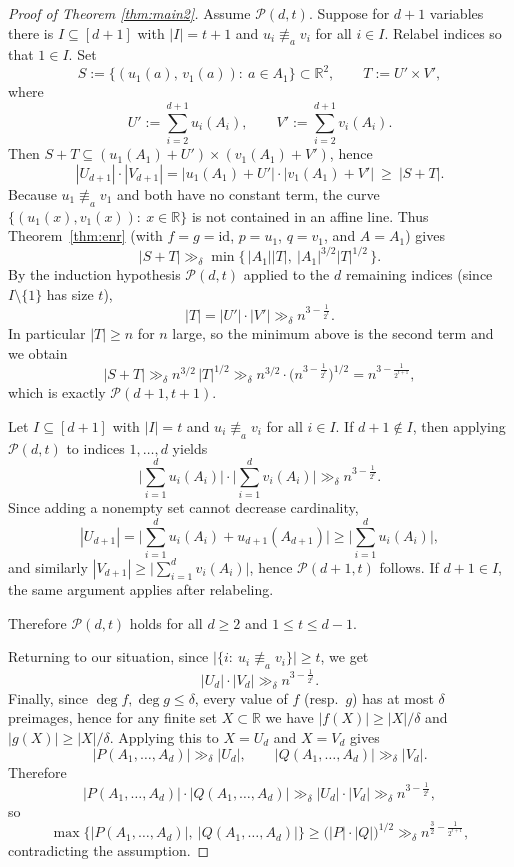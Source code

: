 \documentclass[12pt,reqno]{amsart}
\numberwithin{equation}{section}
\begin{document}
\begin{proof}[Proof of Theorem \ref{thm:main2}]
\smallskip
{}
Assume $\mathcal P(d,t)$. Suppose for $d+1$ variables there is $I\subseteq[d+1]$ with $|I|=t+1$ and $u_i\not\equiv_a v_i$ for all $i\in I$. Relabel indices so that $1\in I$. Set
\[
S:=\{(u_1(a),\,v_1(a)):\ a\in A_1\}\subset\mathbb R^2,
\qquad
T:=U'\times V',
\]
where
\[
U':=\sum_{i=2}^{d+1}u_i(A_i),\qquad V':=\sum_{i=2}^{d+1}v_i(A_i).
\]
Then $S+T\subseteq (u_1(A_1)+U')\times (v_1(A_1)+V')$, hence
\[
|U_{d+1}|\cdot |V_{d+1}|=|u_1(A_1)+U'|\cdot |v_1(A_1)+V'|\ \ge\ |S+T|.
\]
Because $u_1\not\equiv_a v_1$ and both have no constant term, the curve $\{(u_1(x),v_1(x)):\ x\in\mathbb R\}$ is not contained in an affine line. Thus Theorem~\ref{thm:enr} (with $f=g=\mathrm{id}$, $p=u_1$, $q=v_1$, and $A=A_1$) gives
\[
|S+T|\gg_{\delta}\min\{\,|A_1||T|,\ |A_1|^{3/2}|T|^{1/2}\,\}.
\]
By the induction hypothesis $\mathcal P(d,t)$ applied to the $d$ remaining indices (since $I\setminus\{1\}$ has size $t$),
\[
|T|=|U'|\cdot |V'|\gg_{\delta} n^{3-\frac1{2^{t}}}.
\]
In particular $|T|\ge n$ for $n$ large, so the minimum above is the second term and we obtain
\[
|S+T|\gg_{\delta} n^{3/2}\,|T|^{1/2}\gg_{\delta} n^{3/2}\cdot
\Big(n^{3-\frac1{2^{t}}}\Big)^{1/2}
=
n^{3-\frac1{2^{t+1}}},
\]
which is exactly $\mathcal P(d+1,t+1)$.

\smallskip
{}
Let $I\subseteq[d+1]$ with $|I|=t$ and $u_i\not\equiv_a v_i$ for all $i\in I$. If $d+1\notin I$, then applying $\mathcal P(d,t)$ to indices $1,\dots,d$ yields
\[
\Big|\sum_{i=1}^{d}u_i(A_i)\Big|\cdot \Big|\sum_{i=1}^{d}v_i(A_i)\Big|\gg_{\delta} n^{3-\frac1{2^{t}}}.
\]
Since adding a nonempty set cannot decrease cardinality,
\[
|U_{d+1}|=\Big|\sum_{i=1}^{d}u_i(A_i)+u_{d+1}(A_{d+1})\Big|\ge \Big|\sum_{i=1}^{d}u_i(A_i)\Big|,
\]
and similarly $|V_{d+1}|\ge \big|\sum_{i=1}^{d}v_i(A_i)\big|$, hence $\mathcal P(d+1,t)$ follows. If $d+1\in I$, the same argument applies after relabeling.

\smallskip
\noindent Therefore $\mathcal P(d,t)$ holds for all $d\ge 2$ and $1\le t\le d-1$.

\smallskip
\noindent Returning to our situation, since $\bigl|\{i:\ u_i\not\equiv_a v_i\}\bigr|\ge t$, we get
\[
|U_d|\cdot |V_d|\gg_{\delta} n^{3-\frac1{2^{t}}}.
\]
Finally, since $\deg f,\deg g\le \delta$, every value of $f$ (resp.\ $g$) has at most $\delta$ preimages, hence for any finite set $X\subset\mathbb R$ we have $|f(X)|\ge |X|/\delta$ and $|g(X)|\ge |X|/\delta$. Applying this to $X=U_d$ and $X=V_d$ gives
\[
|P(A_{1},\ldots,A_{d})|\gg_{\delta} |U_d|,
\qquad
|Q(A_{1},\ldots,A_{d})|\gg_{\delta} |V_d|.
\]
Therefore
\[
|P(A_{1},\ldots,A_{d})|\cdot |Q(A_{1},\ldots,A_{d})|
\gg_{\delta}
|U_d|\cdot |V_d|
\gg_{\delta}
n^{3-\frac1{2^{t}}},
\]
so
\[
\max\{|P(A_{1},\ldots,A_{d})|,\ |Q(A_{1},\ldots,A_{d})|\}
\ge
\big(|P|\cdot |Q|\big)^{1/2}
\gg_{\delta}
n^{\frac32-\frac1{2^{t+1}}},
\]
contradicting the assumption.








\end{proof}
\end{document}
